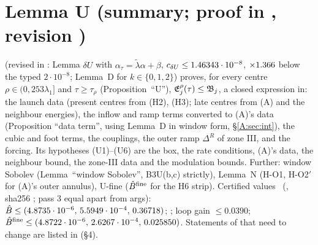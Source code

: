 \documentclass[11pt]{article}
\begin{document}






\section{Lemma U (summary; proof in , revision )}\label{M:sec:U}
 (revised in : Lemma $\delta U$ with $\alpha_\tau=\tilde\lambda\alpha+\beta$, $c_{\delta U}\le1.46343\cdot10^{-8}$, $\times1.366$ below the typed $2\cdot10^{-8}$; Lemma~D for $k\in\{0,1,2\}$) proves, for every centre $\rho\in(0,253\lambda_1]$ and $\tau\ge\tau_\rho$ (Proposition~``U''), $\mathfrak E^\rho_j(\tau)\le\mathfrak B_j$, a closed expression in: the launch data (present centres from (H2), (H3); late centres from (A) and the neighbour energies), the inflow and ramp terms converted to (A)'s data (Proposition ``data term'', using Lemma~D in window form, \S\ref{A:sec:int}), the cubic and foot terms, the couplings, the outer ramp $\Delta^R$ of zone III, and the forcing. Its hypotheses (U1)--(U6) are the box, the rate conditions, (A)'s data, the neighbour bound, the zone-III data and the modulation bounds. Further: window Sobolev (Lemma~``window Sobolev'', B3U(b,c) strictly), Lemma~N (H-O1, H-O2$'$ for (A)'s outer annulus), U-fine ($\hat B^{\rm fine}$ for the H6 strip). Certified values \tC\ (, sha256 ; pass 3 equal apart from args): $\hat B\le(4.8735\cdot10^{-6},\,5.5949\cdot10^{-4},\,0.36718)$; \UmarV; loop gain $\le0.0390$; $\hat B^{\rm fine}\le(4.8722\cdot10^{-6},\,2.6267\cdot10^{-4},\,0.025850)$. Statements of  that need to change are listed in  (\S4).
\end{document}
